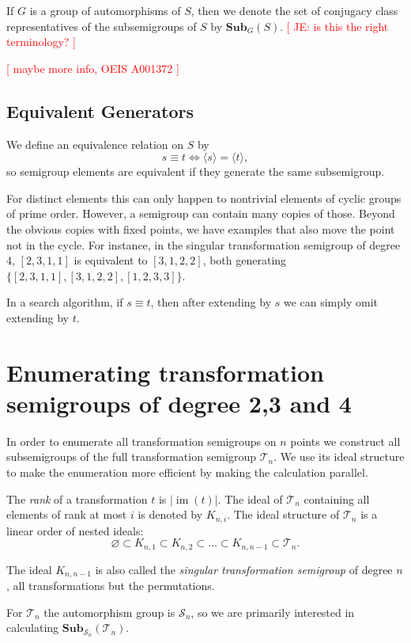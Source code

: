 \documentclass{amsart}
\newcommand{\cT}{{\mathcal T}}
\newcommand{\cS}{{\mathcal S}}
\newcommand{\Sub}{\mathbf{Sub}}
\DeclareMathOperator{\im}{im}
\newcommand{\todo}[1]{\textcolor{red}{ \small \textsf{[ #1 ]} \normalsize}}
\theoremstyle{plain}
\theoremstyle{definition}
\begin{document}
If $G$ is a group of automorphisms of $S$, then we denote the set of conjugacy class representatives of the subsemigroups of $S$ by $\Sub_G(S)$. \todo{JE: is this the right terminology?}

\todo{maybe more info, OEIS A001372}


\subsection{Equivalent Generators}
\label{sec:equivgen}
We define an equivalence relation on $S$ by
$$ s\equiv t \Longleftrightarrow \langle s \rangle= \langle t  \rangle,$$
so semigroup elements are equivalent if they generate the same subsemigroup.

For distinct elements this can only happen to nontrivial elements of cyclic groups of prime order.
However, a semigroup can contain many copies of those.
Beyond the obvious copies with fixed points, we have examples that also move the point not in the cycle. For instance, in the singular transformation semigroup of degree 4, $[ 2, 3, 1, 1 ]$ is equivalent to  $[ 3, 1, 2, 2 ]$, both generating $\{ [ 2, 3, 1, 1 ], [ 3, 1, 2, 2 ], [ 1, 2, 3, 3 ]\}$.

In a search algorithm, if $s\equiv t$, then after extending by $s$ we can simply omit extending by $t$.

\section{Enumerating transformation semigroups of degree 2,3 and 4}
\label{sec:fulltranssgp}

In order to enumerate all transformation semigroups on $n$ points we construct
all subsemigroups of the full transformation semigroup $\cT_n$. We use its ideal
structure to make the enumeration more efficient by making the calculation parallel.

The \emph{rank} of a transformation $t$ is $|\im(t)|$. 
The ideal of $\cT_n$ containing all elements of rank at most $i$ is denoted by $K_{n,i}$.
The ideal structure of $\cT_n$ is a linear order of nested ideals: %
$$\varnothing\subset K_{n,1}\subset K_{n,2}\subset\ldots\subset K_{n,n-1}\subset \cT_n.$$

The ideal $K_{n,n-1}$ is also called the \emph{singular transformation semigroup} of degree $n$, all transformations but the permutations.

 For $\cT_n$ the automorphism group is $\cS_n$, so we are primarily interested in calculating $\Sub_{\cS_n}(\cT_n)$.
\end{document}
